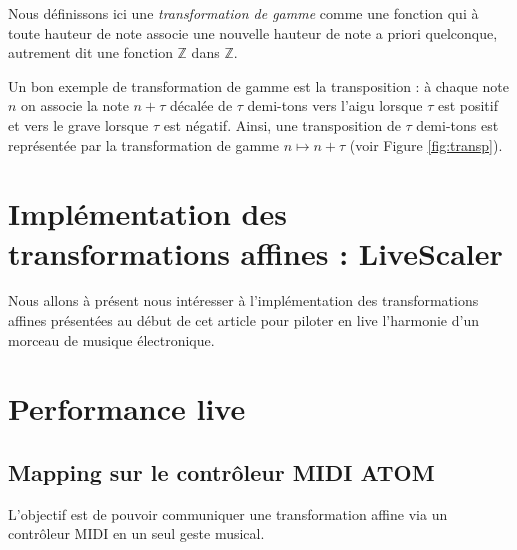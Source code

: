 \documentclass[french,11pt]{article}
\begin{document}
Nous définissons ici une \emph{transformation de gamme} comme une fonction qui à toute hauteur de note associe une nouvelle hauteur de note a priori quelconque, autrement dit une fonction $\mathbb{Z}$ dans $\mathbb{Z}$.

Un bon exemple de transformation de gamme est la transposition : à chaque note $n$ on associe la note $n+\tau$  décalée de $\tau$ demi-tons vers l'aigu lorsque $\tau$ est positif et vers le grave lorsque $\tau$ est négatif. Ainsi, une transposition de $\tau$ demi-tons est représentée par la transformation de gamme $ n \mapsto n+\tau$ (voir Figure \ref{fig:transp}).










\section{Implémentation des transformations affines : LiveScaler}
Nous allons à présent nous intéresser à l'implémentation des transformations affines présentées au début de cet article pour piloter en live l'harmonie d'un morceau de musique électronique. 









\section{Performance live }
\subsection{Mapping sur le contrôleur MIDI ATOM}
L'objectif est de pouvoir communiquer une transformation affine via un contrôleur MIDI en un seul geste musical.
\end{document}
